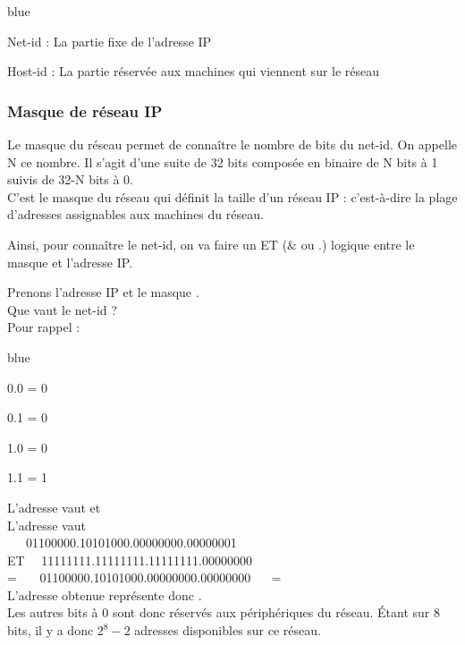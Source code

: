 \begin{items}{blue}{\Bullet}
	\item Net-id : La partie fixe de l'adresse IP
	\item Host-id : La partie réservée aux machines qui viennent sur le réseau
\end{items}


\subsubsection{Masque de réseau IP}

Le masque du réseau permet de connaître le nombre de bits du net-id. On appelle N ce nombre. Il s’agit d’une suite de 32 bits 
composée en binaire de N bits à 1 suivis de 32-N bits à 0.\\
C’est le masque du réseau qui définit la taille d’un réseau IP : c’est-à-dire la plage d’adresses assignables aux machines du réseau.

Ainsi, pour connaître le net-id, on va faire un ET (\& ou .) logique entre le masque et l'adresse IP.

\begin{exemple}

	Prenons l'adresse IP  et le masque . \\ Que vaut le net-id ? \\
	Pour rappel : 
	\begin{items}{blue}{\Triangle}
		\item 0.0 = 0
		\item 0.1 = 0
		\item 1.0 = 0
		\item 1.1 = 1
	\end{items}

\end{exemple}

	
\begin{solution}
	
	L'adresse  vaut  et \\
L'adresse  vaut  \\


~~~01100000.10101000.00000000.00000001 \\
ET
~~11111111.11111111.11111111.00000000 \\
=
~~~01100000.10101000.00000000.00000000 ~~ = ~~ \\

L'adresse  obtenue représente donc .\\

Les autres bits à 0 sont donc réservés aux périphériques du réseau. Étant sur 8 bits, il y a donc $2^8-2$ adresses 
disponibles sur ce réseau.

\end{solution}


